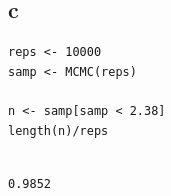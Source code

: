 \documentclass[11pt]{article}
\begin{document}
\subsection*{c}
\label{sec:orgb0e2790}

\begin{verbatim}
reps <- 10000
samp <- MCMC(reps)

n <- samp[samp < 2.38]
length(n)/reps


\end{verbatim}

\begin{verbatim}
0.9852
\end{verbatim}
\end{document}
